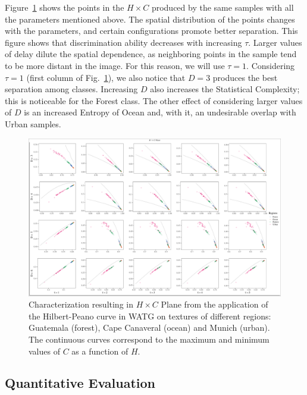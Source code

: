 \documentclass[journal]{IEEEtran}
\begin{document}
Figure~\ref{fig:Regions} shows the points in the $H\times C$ produced by the same samples with all the parameters mentioned above.
The spatial distribution of the points changes with the parameters,
and certain configurations promote better separation.
This figure shows that discrimination ability decreases with increasing $\tau$.
Larger values of delay dilute the spatial dependence, as neighboring points in the sample tend to be more distant in the image.
For this reason, we will use $\tau=1$.
Considering $\tau=1$ (first column of Fig.~\ref{fig:Regions}), 
we also notice that $D=3$ produces the best separation among classes.
Increasing $D$ also increases the Statistical Complexity; this is noticeable for the Forest class.
The other effect of considering larger values of $D$ is an increased Entropy of Ocean and, with it, an undesirable overlap with Urban samples.

\begin{figure}
	\centering
	\includegraphics[width=1\textwidth]{Figures/WATGHC.pdf}
	\caption{Characterization resulting in $H \times C$ Plane from the application of the Hilbert-Peano curve in WATG on textures of different regions: Guatemala (forest), Cape Canaveral (ocean) and Munich (urban). 
	The continuous curves correspond to the maximum and minimum values of $C$ as a function of $H$.}
	\label{fig:Regions}
\end{figure}

\subsection{Quantitative Evaluation}
\end{document}
